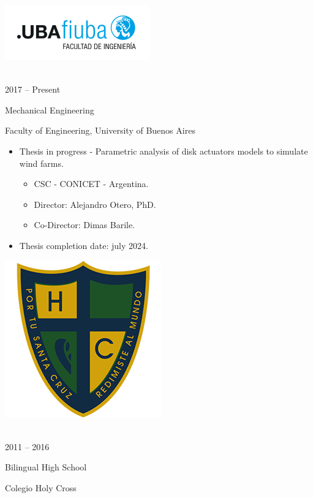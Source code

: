 \documentclass[a4paper,10pt]{article}
\newlength{\cvcolumngapwidth}
\newlength{\cvleftcolumnwidth}
\newlength{\cvrightcolumnwidth}
\newcommand{\cvtitlestyle}[1]{{\large\cvtitlefont\textcolor{cvtitlecolor}{#1}}}
\newcommand{\cvdurationstyle}[1]{{\small\cvdurationfont\textcolor{cvdurationcolor}{#1}}}
\newlength{\cvafteritemskipamount}
\newlength{\cvaftertitleskipamount}
\newlength{\cvparskip}
\newcommand{\cvitem}[2]{
    \begin{minipage}[t]{\cvleftcolumnwidth}
        \raggedleft #1
    \end{minipage}%
    \hspace{\cvcolumngapwidth}%
    \begin{minipage}[t]{\cvrightcolumnwidth}
        \setlength{\parskip}{\cvparskip} #2
    \end{minipage}

    \vspace{\cvafteritemskipamount}
}
\newcommand{\cvtitle}[1]{
    \cvtitlestyle{#1}

    \vspace{\cvaftertitleskipamount}
    \vspace{-\cvparskip}
}
\begin{document}
\cvitem{
 	\begin{minipage}{\textwidth}
   \begin{flushright}
		  \includegraphics[height=0.25\textwidth]{../logos-photos/Logo_FIUBA_new.png}   
    \end{flushright}  
  \end{minipage} \\
  \vspace{0.1cm}
  \cvdurationstyle{2017 -- Present}
}{
  \cvtitle{Mechanical Engineering}

    Faculty of Engineering, University of Buenos Aires
    
    \begin{itemize}[leftmargin=*]
      \item \textsf{Thesis in progress - Parametric analysis of disk actuators models to simulate wind farms.} 
        \begin{itemize}
          \item CSC - CONICET - Argentina.
          \item Director: Alejandro Otero, PhD.
          \item Co-Director: Dimas Barile.
        \end{itemize}
        \item Thesis completion date: july 2024.
    \end{itemize}
}


\cvitem{
    \begin{minipage}{\textwidth}
        \flushright
        \includegraphics[height=0.2\textwidth]{../logos-photos/Logo_HC.png}   
    \end{minipage}\\  
    \vspace{0.1cm}
    \cvdurationstyle{2011 -- 2016}
}{
    \cvtitle{Bilingual High School}

    Colegio Holy Cross
}
\end{document}
